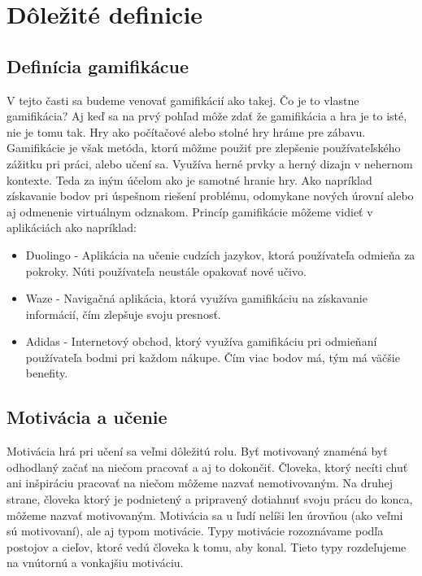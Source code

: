 \documentclass[10pt,oneside,slovak,a4paper]{article}
\begin{document}
\section{Dôležité definicie} \label{definicie}
\subsection{Definícia gamifikácue} \label{gamifikacia}
V tejto časti sa budeme venovať gamifikácií ako takej. Čo je to vlastne gamifikácia? Aj keď sa na prvý pohľad môže zdať že gamifikácia a hra je to isté, nie je tomu tak. Hry ako počítačové alebo stolné hry hráme pre zábavu. Gamifikácie je však metóda, ktorú môžme použiť pre zlepšenie používateľského zážitku pri práci, alebo učení sa. Využíva herné prvky a herný dizajn v nehernom kontexte. Teda za iným účelom ako je samotné hranie hry. Ako napríklad získavanie bodov pri úspešnom riešení problému, odomykane nových úrovní alebo aj odmenenie virtuálnym odznakom. Princíp gamifikácie môžeme vidieť v aplikáciách ako napríklad:

\begin{itemize}
    \item Duolingo - Aplikácia na učenie cudzích jazykov, ktorá používateľa odmieňa za pokroky. Núti používateľa neustále opakovať nové učivo.
    \item Waze - Navigačná aplikácia, ktorá využíva gamifikáciu na získavanie informácií, čím zlepšuje svoju presnosť.
    \item Adidas - Internetový obchod, ktorý využíva gamifikáciu pri odmieňaní používateľa bodmi pri každom nákupe. Čím viac bodov má, tým má väčšie benefity.
\end{itemize}



\subsection{Motivácia a učenie} \label{motivacia}
Motivácia hrá pri učení sa veľmi dôležitú rolu. Byť motivovaný znaméná byť odhodlaný začať na niečom pracovať a aj to dokončiť. Človeka, ktorý necíti chuť ani inšpiráciu pracovať na niečom môžeme nazvať nemotivovaným. Na druhej strane, človeka ktorý je podnietený a pripravený dotiahnuť svoju prácu do konca, môžeme nazvať motivovaným. Motivácia sa u ľudí nelíši len úrovňou (ako veľmi sú motivovaní), ale aj typom motivácie. Typy motivácie rozoznávame podľa postojov a cieľov, ktoré vedú človeka k tomu, aby konal. Tieto typy rozdeľujeme na vnútornú a vonkajšiu motiváciu. ~\cite{ryan2000intrinsic}
\end{document}
